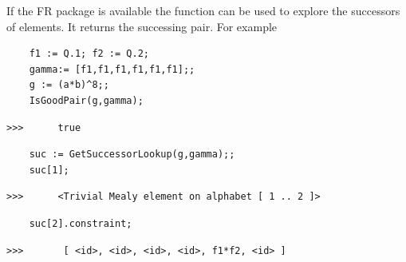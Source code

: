 \documentclass[a4paper,11pt]{amsart}
\begin{document}
If the FR package is available
the function  can be used to explore the
successors of elements. It returns the successing pair. For example
 \begin{lstlisting}
    f1 := Q.1; f2 := Q.2;
    gamma:= [f1,f1,f1,f1,f1,f1];;
    g := (a*b)^8;;
    IsGoodPair(g,gamma);
\end{lstlisting}
\begin{verbatim}
>>>      true
\end{verbatim} 
\begin{lstlisting}
    suc := GetSuccessorLookup(g,gamma);;    
    suc[1];
\end{lstlisting}
\begin{verbatim}
>>>      <Trivial Mealy element on alphabet [ 1 .. 2 ]>
\end{verbatim} 
\begin{lstlisting}
    suc[2].constraint;
\end{lstlisting}
\begin{verbatim}
>>>       [ <id>, <id>, <id>, <id>, f1*f2, <id> ]
\end{verbatim} 





\appendix
% 
%
\end{document}
